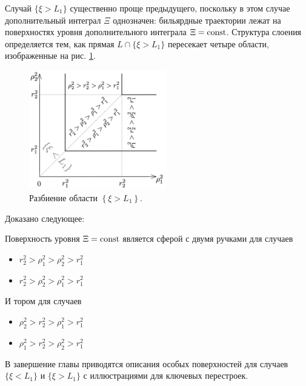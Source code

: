 Случай $\{\xi > L_1\}$ существенно проще предыдущего, поскольку в этом случае дополнительный интеграл $\Xi$ однозначен: бильярдные траектории лежат на поверхностях уровня дополнительного интеграла $\Xi=\mathrm{const}$.
Структура слоения определяется тем, как прямая $L \cap  \{\xi > L_1\}$ пересекает четыре области, изображенные на рис. \ref{fig:pt10:_xiL1_subdivision}.
\begin{figure}[!htb]
\centering
\includegraphics[width=6cm]{images/ch4/section3_circular/sect3_xiL1_subdivision.pdf}
    \caption{Разбиение области $\left\{\xi > L_1\right\}$.}
    \label{fig:pt10:_xiL1_subdivision}
\end{figure}
Доказано следующее:
\begin{theorem}
Поверхность уровня $\Xi = \mathrm{const}$ является сферой с двумя ручками для случаев
\begin{itemize}[beginpenalty=10000]
\item $r_2^2 > \rho_1^2 > \rho_2^2 > r_1^2$
\item $r_2^2 > \rho_2^2 > \rho_1^2 > r_1^2$
\end{itemize}
И тором для случаев 
\begin{itemize}[beginpenalty=10000]
\item $\rho_2^2 > r_2^2 > \rho_1^2 > r_1^2$
\item $\rho_1^2 > r_2^2 > \rho_2^2 > r_1^2$
\end{itemize}
\end{theorem}

В завершение главы приводятся описания особых поверхностей для случаев $\{\xi < L_1\}$ и $\{\xi > L_1\}$ с иллюстрациями для ключевых перестроек.
